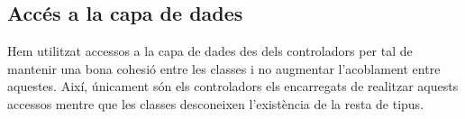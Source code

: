 \subsection{Accés a la capa de dades}
Hem utilitzat accessos a la capa de dades des dels controladors per tal de mantenir una bona cohesió entre les classes i no augmentar l’acoblament entre aquestes. Així, únicament són els controladors els encarregats de realitzar aquests accessos mentre que les classes desconeixen l’existència de la resta de tipus.
